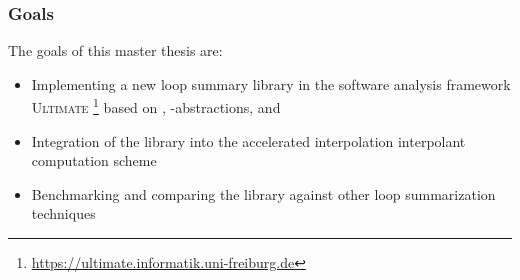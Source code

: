 \begin{frame}[t]
	\frametitle{Goals}
	The goals of this master thesis are:
	\begin{itemize}
		\item Implementing a new loop summary library in the software analysis framework \textsc{Ultimate} \footnote{\url{https://ultimate.informatik.uni-freiburg.de}} based on \qvasr, \qvasr-abstractions, and \qvasrs
		\item Integration of the library into the accelerated interpolation interpolant computation scheme
		\item Benchmarking and comparing the library against other loop summarization techniques
	\end{itemize}
\end{frame}